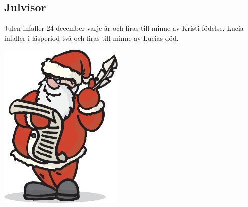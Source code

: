 \begin{flushleft}
\section{Julvisor}
{\Large
Julen infaller 24 december varje år och firas till minne av Kristi
födelse. Lucia infaller i läsperiod två och firas till minne av Lucias död.}
\end{flushleft}

\vspace{2cm}
\begin{center}
\includegraphics[width=6cm]{bilder/jul.eps}
\end{center}
\newpage
{}
\newpage
{}
\newpage
{}
\newpage
{}
\newpage
{}